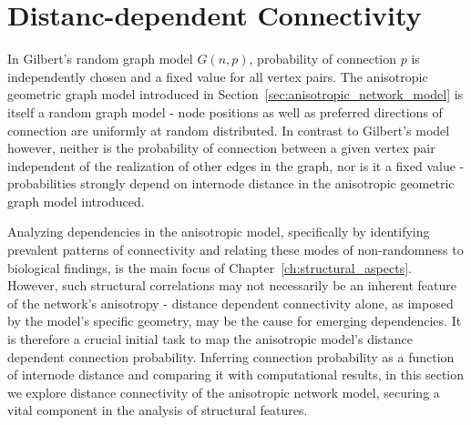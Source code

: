 

\section{Distanc-dependent Connectivity}
\label{sec:distance_connectivity}



In Gilbert's random graph model $G(n,p)$,
probability of connection $p$ is independently chosen and a fixed
value for all vertex pairs. The anisotropic geometric graph model
introduced in Section~\ref{sec:anisotropic_network_model} is itself a
random graph model - node positions as well as preferred directions of
connection are uniformly at random distributed. In contrast to
Gilbert's model however, neither is the probability of connection
between a given vertex pair independent of the realization of other
edges in the graph, nor is it a fixed value - probabilities strongly
depend on internode distance in the anisotropic geometric graph model
introduced.

Analyzing dependencies in the anisotropic model, specifically by
identifying prevalent patterns of connectivity and relating these
modes of non-randomness to biological findings, is the main focus of
Chapter~\ref{ch:structural_aspects}. However, such structural
correlations may not necessarily be an inherent feature of the
network's anisotropy - distance dependent connectivity alone, as
imposed by the model's specific geometry, may be the cause for
emerging dependencies. It is therefore a crucial initial task to map
the anisotropic model's distance dependent connection
probability. Inferring connection probability as a function of
internode distance and comparing it with computational results, in
this section we explore distance connectivity of the anisotropic
network model, securing a vital component in the analysis of
structural features.

